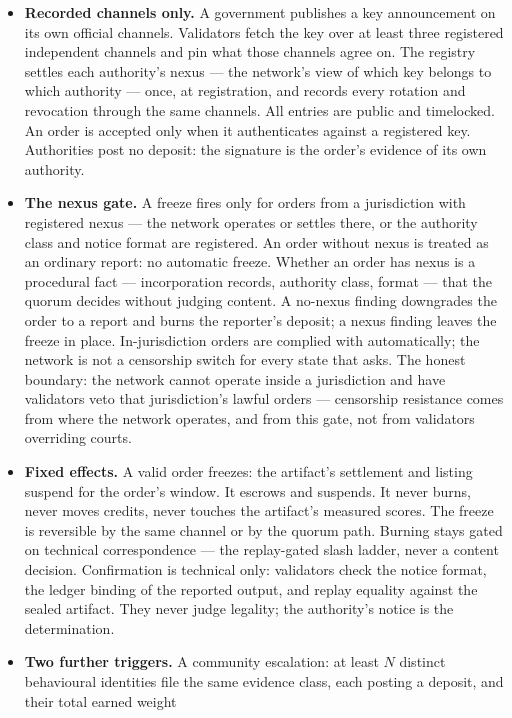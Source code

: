 \documentclass[11pt]{article}
\begin{document}
\begin{itemize}
\item \textbf{Recorded channels only.} A government publishes a
key announcement on its own official channels. Validators fetch
the key over at least three registered independent channels and
pin what those channels agree on. The registry settles each
authority's nexus --- the network's view of which key belongs to
which authority --- once, at registration, and records every
rotation and revocation through the same channels. All entries
are public and timelocked. An order is accepted only when it
authenticates against a registered key. Authorities post no
deposit: the signature is the order's evidence of its own
authority.
\item \textbf{The nexus gate.} A freeze fires only for orders
from a jurisdiction with registered nexus --- the network
operates or settles there, or the authority class and notice
format are registered. An order without nexus is treated as an
ordinary report: no automatic freeze. Whether an order has nexus
is a procedural fact --- incorporation records, authority class,
format --- that the quorum decides without judging content. A
no-nexus finding downgrades the order to a report and burns the
reporter's deposit; a nexus finding leaves the freeze in place.
In-jurisdiction orders are complied with automatically; the
network is not a censorship switch for every state that asks.
The honest boundary: the network cannot operate inside a
jurisdiction and have validators veto that jurisdiction's lawful
orders --- censorship resistance comes from where the network
operates, and from this gate, not from validators overriding
courts.
\item \textbf{Fixed effects.} A valid order freezes: the
artifact's settlement and listing suspend for the order's
window. It escrows and suspends. It never burns, never moves
credits, never touches the artifact's measured scores. The
freeze is reversible by the same channel or by the quorum path.
Burning stays gated on technical correspondence --- the
replay-gated slash ladder, never a content decision.
Confirmation is technical only: validators check the notice
format, the ledger binding of the reported output, and replay
equality against the sealed artifact. They never judge
legality; the authority's notice is the determination.
\item \textbf{Two further triggers.} A community escalation: at
least $N$ distinct behavioural identities file the same evidence
class, each posting a deposit, and their total earned weight

\end{itemize}
\end{document}
